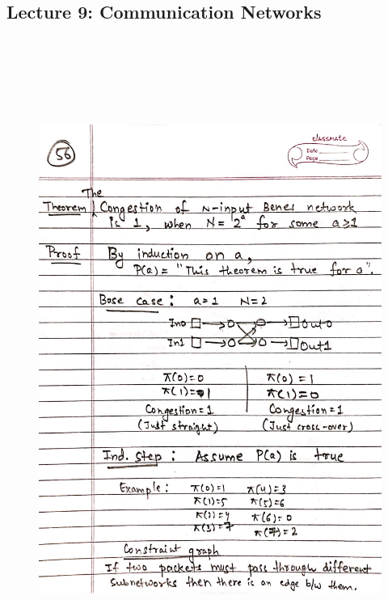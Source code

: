 \newpage
{\color{black} \subsection*{Lecture 9: Communication Networks}}
\begin{figure}[H]
    \centering
    \includegraphics[width=16cm, height=21cm]{"./MIT-6.042J/MIT-6042J-056"}
\end{figure}


